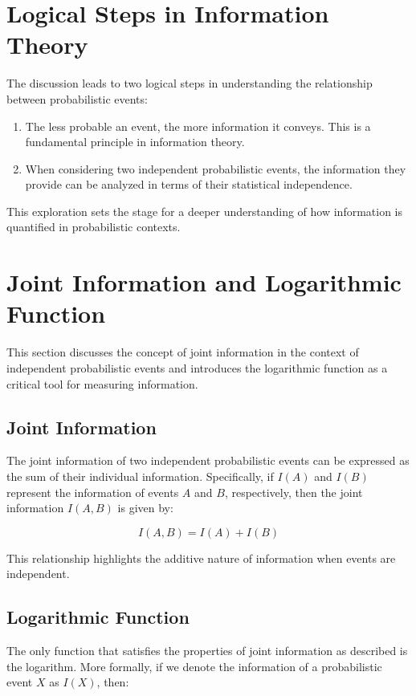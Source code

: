 \documentclass[12pt,a4paper]{article}
\begin{document}
\section{Logical Steps in Information Theory}
The discussion leads to two logical steps in understanding the relationship between probabilistic events:

\begin{enumerate}
    \item The less probable an event, the more information it conveys. This is a fundamental principle in information theory.
    \item When considering two independent probabilistic events, the information they provide can be analyzed in terms of their statistical independence.
\end{enumerate}

This exploration sets the stage for a deeper understanding of how information is quantified in probabilistic contexts.

\section{Joint Information and Logarithmic Function}
This section discusses the concept of joint information in the context of independent probabilistic events and introduces the logarithmic function as a critical tool for measuring information.

\subsection{Joint Information}
The joint information of two independent probabilistic events can be expressed as the sum of their individual information. Specifically, if \( I(A) \) and \( I(B) \) represent the information of events \( A \) and \( B \), respectively, then the joint information \( I(A, B) \) is given by:

\begin{equation}
I(A, B) = I(A) + I(B)
\end{equation}

This relationship highlights the additive nature of information when events are independent.

\subsection{Logarithmic Function}
The only function that satisfies the properties of joint information as described is the logarithm. More formally, if we denote the information of a probabilistic event \( X \) as \( I(X) \), then:
\end{document}
